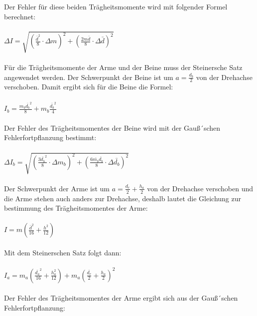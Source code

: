 Der Fehler für diese beiden Trägheitsmomente wird mit folgender Formel berechnet:\\\\

$\Delta I = \sqrt{\left(\frac{\bar{d}^2}{8} \cdot \Delta m \right)^2
  + \left(\frac{2m\bar{d}}{8} \cdot \Delta \bar{d} \right)^2}$\\\\

Für die Trägheitsmomente der Arme und der Beine muss der Steinersche Satz angewendet
werden. Der Schwerpunkt der Beine ist um $a = \frac{d_b}{2}$ von der Drehachse verschoben.
Damit ergibt sich für die Beine die Formel:\\\\

$I_b = \frac{m_b \bar{d_b}^2}{8} + m_b \frac{\bar{d_b}^2}{4}$\\\\

Der Fehler des Trägheitsmomentes der Beine wird mit der Gauß´schen Fehlerfortpflanzung
bestimmt: \\\\

$\Delta I_b = \sqrt{\left(\frac{3\bar{d_b}^2}{8} \cdot \Delta m_b \right)^2
  + \left(\frac{6\bar{m_b}\bar{d_b}}{8} \cdot \Delta \bar{d_b} \right)^2}$\\\\

Der Schwerpunkt der Arme ist um $a = \frac{d_r}{2} + \frac{h_a}{2}$ von der Drehachse verschoben
und die Arme stehen auch anders zur Drehachse, deshalb lautet die Gleichung zur
bestimmung des Trägheitsmomentes der Arme: \\\\

$I = m \left( \frac{\bar{d}^2}{16} + \frac{h^2}{12} \right)$\\\\

Mit dem Steinerschen Satz folgt dann:\\\\

$I_a = m_a \left( \frac{\bar{d_a}^2}{16} + \frac{h_a^2}{12} \right)
+ m_a \left(\frac{\bar{d_r}}{2} + \frac{h_a}{2}\right)^2$ \\\\

Der Fehler des Trägheitsmomentes der Arme ergibt sich aus der Gauß´schen
Fehlerfortpflanzung: \\\\

